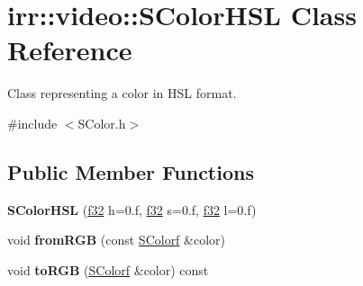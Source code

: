 \hypertarget{classirr_1_1video_1_1SColorHSL}{}\section{irr\+:\+:video\+:\+:S\+Color\+H\+SL Class Reference}
\label{classirr_1_1video_1_1SColorHSL}


Class representing a color in H\+SL format.  




{\ttfamily \#include $<$S\+Color.\+h$>$}

\subsection*{Public Member Functions}
\begin{DoxyCompactItemize}
\item 
{\bfseries S\+Color\+H\+SL} (\hyperlink{namespaceirr_a0277be98d67dc26ff93b1a6a1d086b07}{f32} h=0.f, \hyperlink{namespaceirr_a0277be98d67dc26ff93b1a6a1d086b07}{f32} s=0.f, \hyperlink{namespaceirr_a0277be98d67dc26ff93b1a6a1d086b07}{f32} l=0.f)\hypertarget{classirr_1_1video_1_1SColorHSL_ad75a96f226bcbb38a2237fb7be22f537}{}\label{classirr_1_1video_1_1SColorHSL_ad75a96f226bcbb38a2237fb7be22f537}

\item 
void {\bfseries from\+R\+GB} (const \hyperlink{classirr_1_1video_1_1SColorf}{S\+Colorf} \&color)\hypertarget{classirr_1_1video_1_1SColorHSL_ac5806ad1f238083ac59d6f3d21673e94}{}\label{classirr_1_1video_1_1SColorHSL_ac5806ad1f238083ac59d6f3d21673e94}

\item 
void {\bfseries to\+R\+GB} (\hyperlink{classirr_1_1video_1_1SColorf}{S\+Colorf} \&color) const \hypertarget{classirr_1_1video_1_1SColorHSL_ad0dc9336487c0912d4d72ba3b803f6c6}{}\label{classirr_1_1video_1_1SColorHSL_ad0dc9336487c0912d4d72ba3b803f6c6}

\end{DoxyCompactItemize}
